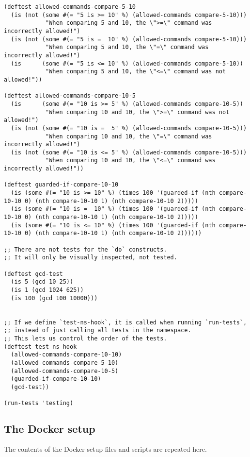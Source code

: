 \documentclass[11pt]{article}
\begin{document}
\begin{verbatim}
(deftest allowed-commands-compare-5-10
  (is (not (some #(= "5 is >= 10" %) (allowed-commands compare-5-10)))
            "When comparing 5 and 10, the \">=\" command was incorrectly allowed!")
  (is (not (some #(= "5 is =  10" %) (allowed-commands compare-5-10)))
            "When comparing 5 and 10, the \"=\" command was incorrectly allowed!")
  (is      (some #(= "5 is <= 10" %) (allowed-commands compare-5-10))
            "When comparing 5 and 10, the \"<=\" command was not allowed!"))

(deftest allowed-commands-compare-10-5
  (is      (some #(= "10 is >= 5" %) (allowed-commands compare-10-5))
            "When comparing 10 and 10, the \">=\" command was not allowed!")
  (is (not (some #(= "10 is =  5" %) (allowed-commands compare-10-5)))
            "When comparing 10 and 10, the \"=\" command was incorrectly allowed!")
  (is (not (some #(= "10 is <= 5" %) (allowed-commands compare-10-5)))
            "When comparing 10 and 10, the \"<=\" command was incorrectly allowed!"))

(deftest guarded-if-compare-10-10
  (is (some #(= "10 is >= 10" %) (times 100 '(guarded-if (nth compare-10-10 0) (nth compare-10-10 1) (nth compare-10-10 2)))))
  (is (some #(= "10 is =  10" %) (times 100 '(guarded-if (nth compare-10-10 0) (nth compare-10-10 1) (nth compare-10-10 2)))))
  (is (some #(= "10 is <= 10" %) (times 100 '(guarded-if (nth compare-10-10 0) (nth compare-10-10 1) (nth compare-10-10 2))))))

;; There are not tests for the `do` constructs.
;; It will only be visually inspected, not tested.

(deftest gcd-test
  (is 5 (gcd 10 25))
  (is 1 (gcd 1024 625))
  (is 100 (gcd 100 10000)))


;; If we define `test-ns-hook`, it is called when running `run-tests`,
;; instead of just calling all tests in the namespace.
;; This lets us control the order of the tests.
(deftest test-ns-hook
  (allowed-commands-compare-10-10)
  (allowed-commands-compare-5-10)
  (allowed-commands-compare-10-5)
  (guarded-if-compare-10-10)
  (gcd-test))

(run-tests 'testing)
\end{verbatim}

\subsection*{The Docker setup}
\label{sec:orgc0bf921}
The contents of the Docker setup files and scripts are repeated here.
\end{document}
